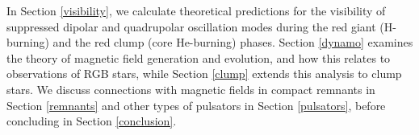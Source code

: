 In Section \ref{visibility}, we calculate theoretical predictions for the visibility of suppressed dipolar and quadrupolar oscillation modes during the red giant (H-burning) and the red clump (core He-burning) phases. Section \ref{dynamo} examines the theory of magnetic field generation and evolution, and how this relates to observations of RGB stars, while Section \ref{clump} extends this analysis to clump stars. We discuss connections with magnetic fields in compact remnants in Section \ref{remnants} and other types of pulsators in Section \ref{pulsators}, before concluding in Section \ref{conclusion}. 




  